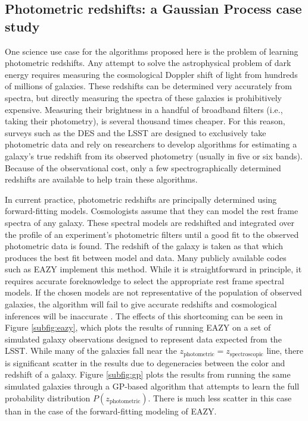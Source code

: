 \documentclass[prd,nofootbib,floatfix,11pt,tightenlines,nofootinbib]{revtex4}
\begin{document}
\subsection{Photometric redshifts: a Gaussian Process case study}
\label{sec:photoz}

One science use case for the algorithms proposed here is the problem of
learning photometric redshifts.  Any attempt to solve the astrophysical
problem of dark energy requires measuring the cosmological Doppler shift of
light from hundreds of millions of galaxies.  These redshifts can be
determined very accurately from spectra, but directly measuring the spectra
of these galaxies is prohibitively expensive.  Measuring their brightness
in a handful of broadband filters (i.e., taking their photometry), is
several thousand times cheaper.  For this reason, surveys such as the DES
and the LSST are designed to exclusively take photometric data and rely on
researchers to develop algorithms for estimating a galaxy's true redshift
from its observed photometry \cite{connolly95} 
(usually in five or six bands).  Because of
the observational cost, only a few spectrographically determined redshifts are available
to help train these algorithms.

In current practice, photometric redshifts are principally determined using
forward-fitting models.  Cosmologists assume that they can model the rest frame
spectra of any galaxy.  These spectral models are
redshifted and integrated over the profile of an experiment's
photometric filters until a good fit to the observed photometric data is
found.  The redshift of the galaxy is taken as that which produces the best fit
between model and data.  Many publicly available codes such as 
EAZY \cite{eazy} implement this method.  
While it is straightforward in principle, it requires
accurate foreknowledge to select the appropriate rest frame 
spectral models.  If the chosen
models are not representative of the population of observed
galaxies, the algorithm will fail to give accurate redshifts and cosmological
inferences will be inaccurate \cite{budavari2008}.  The effects of this
shortcoming can be seen in Figure \ref{subfig:eazy}, which plots the results
of running EAZY on a set of
simulated galaxy observations designed to represent data expected from the
LSST.
While many of the galaxies fall near the
$z_\text{photometric}=z_\text{spectroscopic}$ line, there is significant scatter
in the results due to degeneracies between the color and redshift of a
galaxy.  Figure \ref{subfig:gp} plots the results from running the same
simulated galaxies through a GP-based algorithm that attempts to learn the full
probability distribution $P(z_\text{photometric})$.  There is much less scatter
in this case than in the case of the forward-fitting modeling of EAZY.
\end{document}
